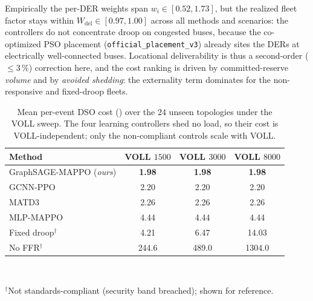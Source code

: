\documentclass[lettersize,journal]{IEEEtran}
\begin{document}
Empirically the per-DER weights span $w_i\in[0.52,1.73]$, but the realized fleet factor stays within $W_{\mathrm{del}}\in[0.97,1.00]$ across all methods and scenarios: the controllers do not concentrate droop on congested buses, because the co-optimized PSO placement (\texttt{official\_placement\_v3}) already sites the DERs at electrically well-connected buses. Locational deliverability is thus a second-order ($\le3\,\%$) correction here, and the cost ranking is driven by committed-reserve \emph{volume} and by \emph{avoided shedding}: the externality term dominates for the non-responsive and fixed-droop fleets.

\begin{table}[!h]
\caption{Mean per-event DSO cost (\texteuro) over the $24$ unseen topologies under the VOLL sweep. The four learning controllers shed no load, so their cost is VOLL-independent; only the non-compliant controls scale with VOLL.}
\label{tab:voll_sweep}
\centering
\footnotesize
\begin{tabular}{lccc}
\toprule
Method & VOLL $1500$ & VOLL $3000$ & VOLL $8000$ \\
\midrule
GraphSAGE-MAPPO (\emph{ours}) & \textbf{1.98} & \textbf{1.98} & \textbf{1.98} \\
GCNN-PPO                      & 2.20 & 2.20 & 2.20 \\
MATD3                         & 2.26 & 2.26 & 2.26 \\
MLP-MAPPO                     & 4.44 & 4.44 & 4.44 \\
\midrule
Fixed droop$^{\dagger}$       & 4.21 & 6.47 & 14.03 \\
No FFR$^{\dagger}$            & 244.6 & 489.0 & 1304.0 \\
\bottomrule
\end{tabular}
\\[3pt]
\raggedright\footnotesize $^{\dagger}$Not standards-compliant (security band breached); shown for reference.
\end{table}

\end{document}
